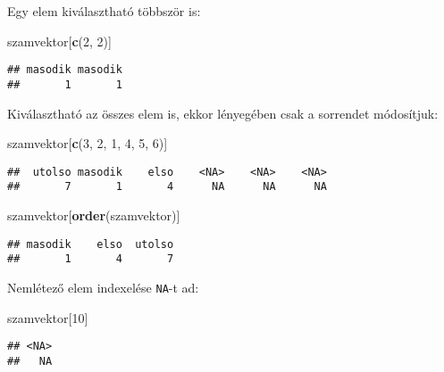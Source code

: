 \documentclass[]{book}
\newenvironment{Shaded}{\begin{snugshade}}{\end{snugshade}}
\newcommand{\KeywordTok}[1]{\textcolor[rgb]{0.13,0.29,0.53}{\textbf{#1}}}
\newcommand{\DecValTok}[1]{\textcolor[rgb]{0.00,0.00,0.81}{#1}}
\newcommand{\NormalTok}[1]{#1}
\begin{document}
Egy elem kiválasztható többször is:

\begin{Shaded}
\begin{Highlighting}[]
\NormalTok{szamvektor[}\KeywordTok{c}\NormalTok{(}\DecValTok{2}\NormalTok{, }\DecValTok{2}\NormalTok{)]}
\end{Highlighting}
\end{Shaded}

\begin{verbatim}
## masodik masodik 
##       1       1
\end{verbatim}

Kiválasztható az összes elem is, ekkor lényegében csak a sorrendet
módosítjuk:

\begin{Shaded}
\begin{Highlighting}[]
\NormalTok{szamvektor[}\KeywordTok{c}\NormalTok{(}\DecValTok{3}\NormalTok{, }\DecValTok{2}\NormalTok{, }\DecValTok{1}\NormalTok{, }\DecValTok{4}\NormalTok{, }\DecValTok{5}\NormalTok{, }\DecValTok{6}\NormalTok{)]}
\end{Highlighting}
\end{Shaded}

\begin{verbatim}
##  utolso masodik    elso    <NA>    <NA>    <NA> 
##       7       1       4      NA      NA      NA
\end{verbatim}

\begin{Shaded}
\begin{Highlighting}[]
\NormalTok{szamvektor[}\KeywordTok{order}\NormalTok{(szamvektor)]}
\end{Highlighting}
\end{Shaded}

\begin{verbatim}
## masodik    elso  utolso 
##       1       4       7
\end{verbatim}

Nemlétező elem indexelése \texttt{NA}-t ad:

\begin{Shaded}
\begin{Highlighting}[]
\NormalTok{szamvektor[}\DecValTok{10}\NormalTok{]}
\end{Highlighting}
\end{Shaded}

\begin{verbatim}
## <NA> 
##   NA
\end{verbatim}
\end{document}
